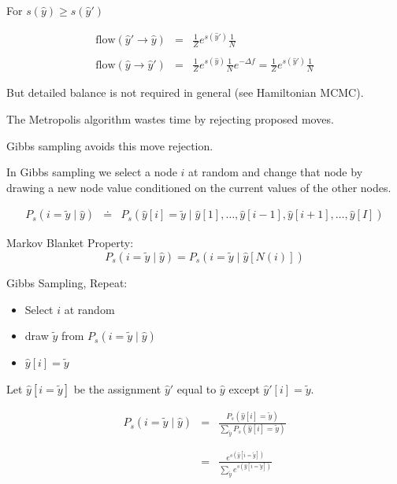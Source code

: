 {

For $s(\hat{y}) \geq s(\hat{y}')$

\vfill
\begin{eqnarray*}
  \mathrm{flow}(\hat{y}' \rightarrow \hat{y}) &  = & \frac{1}{Z}e^{s(\hat{y}')} \frac{1}{N} \\
  \\
\mathrm{flow}(\hat{y} \rightarrow \hat{y}') & = & \frac{1}{Z}e^{s(\hat{y})} \frac{1}{N} e^{-\Delta f} = \frac{1}{Z} e^{s(\hat{y}')} \frac{1}{N}
\end{eqnarray*}

\vfill
But detailed balance is not required in general (see Hamiltonian MCMC).


The Metropolis algorithm wastes time by rejecting proposed moves.

\vfill
Gibbs sampling avoids this move rejection.

\vfill
In Gibbs sampling we select a node $i$ at random and change that node by drawing a new node value conditioned on the current values of the other nodes.


\begin{eqnarray*}
  P_s(i=\tilde{y} \;|\;\hat{y}) & \doteq & P_s(\hat{y}[i] = \tilde{y}\;|\;\hat{y}[1],\ldots,\hat{y}[i-1],\hat{y}[i+1],\ldots,\hat{y}[I])
\end{eqnarray*}

\vfill
Markov Blanket Property:
$$P_s(i=\tilde{y} \;|\;\hat{y}) = P_s(i=\tilde{y} \;|\;\hat{y}[N(i)])$$
  
\vfill
Gibbs Sampling, Repeat:

\begin{itemize}
\item   Select $i$ at random

\item draw $\tilde{y}$ from $P_s(i = \tilde{y} \;|\;\hat{y})$

\item $\hat{y}[i] = \tilde{y}$
\end{itemize}


Let $\hat{y}[i = \tilde{y}]$ be the assignment $\hat{y}'$ equal to $\hat{y}$ except $\hat{y}'[i] = \tilde{y}$.

\vfill
\begin{eqnarray*}
 P_s(i = \tilde{y} \;|\; \hat{y})  & = & \frac{P_s(\hat{y}[i] = \tilde{y})}{\sum_{\tilde{y}} P_s(\hat{y}[i] = \tilde{y})} \\
  \\
  \\
  & = & \frac{e^{s(\hat{y}[i = \tilde{y}])}}{\sum_{\tilde{y}} e^{s(\hat{y}[i = \tilde{y}])}}
\end{eqnarray*}

}
